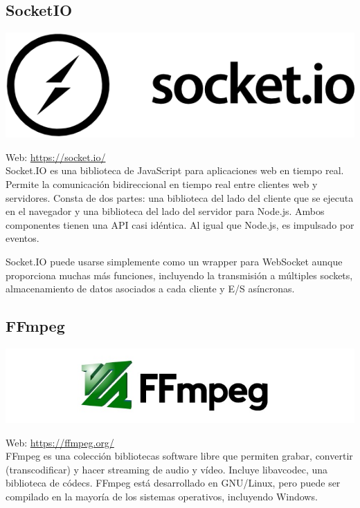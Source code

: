 \subsection{SocketIO}

\begin{center}
\includegraphics[scale=0.3]{imagenes/socketio-logo.png}
\end{center}

Web: \url{https://socket.io/}\\

Socket.IO es una biblioteca de JavaScript para aplicaciones web en tiempo real. Permite la comunicación bidireccional en tiempo real entre clientes web y servidores. Consta de dos partes: una biblioteca del lado del cliente
que se ejecuta en el navegador y una biblioteca del lado del servidor para Node.js. Ambos componentes tienen una API casi idéntica. Al igual que Node.js, es impulsado por eventos.

Socket.IO puede usarse simplemente como un wrapper para WebSocket aunque proporciona muchas más funciones, incluyendo la transmisión a múltiples sockets, almacenamiento de datos asociados a cada cliente y E/S asíncronas.


\subsection{ FFmpeg }


\begin{center}
\includegraphics[scale=0.75]{imagenes/Ffmpeg-logo.jpg}
\end{center}

Web: \url{https://ffmpeg.org/}\\

FFmpeg es una colección bibliotecas software libre que permiten grabar, convertir (transcodificar) y hacer streaming de audio y vídeo. Incluye libavcodec, una biblioteca de códecs. FFmpeg está desarrollado en GNU/Linux, pero puede ser compilado
en la mayoría de los sistemas operativos, incluyendo Windows.\\

